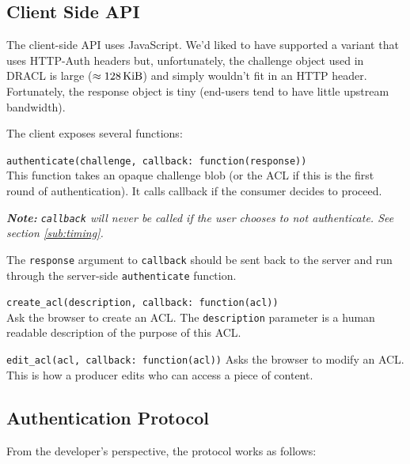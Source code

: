 \documentclass[pdftex,12pt,a4papaer,twoside,notitlepage]{report}
\newcommand{\note}[1]{\vspace{1em} \begin{spacing}{1}\textit{\textbf{Note:} #1}\end{spacing}\vspace{1em}}
\begin{document}
\subsection{Client Side API}

The client-side API uses JavaScript. We'd liked to have supported a variant that
uses HTTP-Auth headers but, unfortunately, the challenge object used in DRACL is
large ($\approx\unit[128]{KiB}$) and simply wouldn't fit in an HTTP header.
Fortunately, the response object is tiny (end-users tend to have little upstream
bandwidth).

The client exposes several functions:

\begin{compactitem}[$\lambda$]
\item \verb=authenticate(challenge, callback: function(response))= \\
  This function takes an opaque challenge blob (or the ACL if this is the first
  round of authentication). It calls callback if the consumer decides to
  proceed.

  \note{\texttt{callback} will never be called if the user chooses to not
    authenticate. See section \ref{sub:timing}.}

  The \texttt{response} argument to \texttt{callback} should be sent back to the
  server and run through the server-side \texttt{authenticate} function.
\item \verb=create_acl(description, callback: function(acl))= \\
  Ask the browser to create an ACL. The \texttt{description} parameter is a human
  readable description of the purpose of this ACL.
\item \verb=edit_acl(acl, callback: function(acl))=
  Asks the browser to modify an ACL. This is how a producer edits who can access
  a piece of content.
\end{compactitem}

\subsection{Authentication Protocol}

From the developer's perspective, the protocol works as follows:

\newcommand{\server}{\underline{\texttt{server}}}
\newcommand{\client}{\underline{\texttt{client}}}
\end{document}
